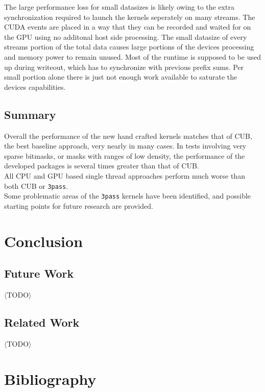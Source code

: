 \documentclass{tudscrreprt}
\newcommand{\markr}[1]{\textcolor{review}{$\langle$#1$\rangle$}}
\begin{document}
			The large performance loss for small datasizes is likely owing to the extra synchronization required to launch the kernels seperately on many streams. The CUDA events are placed in a way that they can be recorded and waited for on the GPU using no additonal host side processing. The small datasize of every streams portion of the total data causes large portions of the devices processing and memory power to remain unused. Most of the runtime is supposed to be used up during writeout, which has to synchronize with previous prefix sums. Per small portion alone there is just not enough work available to saturate the devices capabilities. \\
		
		\section{Summary}
			Overall the performance of the new hand crafted kernels matches that of CUB, the best baseline approach, very nearly in many cases. In tests involving very sparse bitmasks, or masks with ranges of low density, the performance of the developed packages is several times greater than that of CUB. \\
			All CPU and GPU based single thread approaches perform much worse than both CUB or \texttt{3pass}. \\
			
			Some problematic areas of the \texttt{3pass} kernels have been identified, and possible starting points for future research are provided. \\
		
	\chapter{Conclusion}
	
		\section{Future Work}
			\markr{TODO}\\
		
		\section{Related Work}
			\markr{TODO}\\
	
	\chapter*{Bibliography}
		\printbibliography[heading=none]
	
\end{document}
